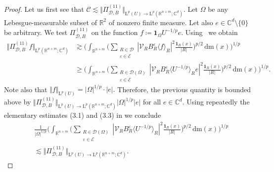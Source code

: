 \documentclass{article}
\theoremstyle{definition}
\theoremstyle{remark}
\numberwithin{equation}{section}
\newcommand{\mathdm}{\,\mathrm{dm}}
\newcommand{\cC}{\mathcal{C}}
\newcommand{\cE}{\mathcal{E}}
\newcommand{\cV}{\mathcal{V}}
\newcommand{\bfD}{\bm{\mathcal{D}}}
\newcommand{\e}{\varepsilon}
\newcommand{\reals}{\mathbb{R}}
\newcommand{\complex}{\mathbb{C}}
\newcommand{\Lp}[1]{\mathrm{L}^{#1}}
\newcommand{\1}{\mathbf{1}}
\begin{document}
\begin{proof}
        Let us first see that $\cC\lesssim\Vert\Pi_{\bfD,B}^{(11)}\Vert_{\Lp{p}(U)\rightarrow \Lp{p}(\reals^{n+m};\complex^d)}.$ Let $\Omega$ be any Lebesgue-measurable subset of $\reals^2$ of nonzero finite measure. Let also $e\in\complex^d\setminus\{0\}$ be arbitrary. We test $\Pi_{\bfD,B}^{(11)}$ on the function $f\coloneq \1_{\Omega}U^{-1/p}e.$ Using~\cite[Lemma~5.3]{DKPS2024} we obtain
        \begin{align*}
            \Vert\Pi_{\bfD,B}^{(11)}f\Vert_{\Lp{p}(\reals^{n+m};\complex^d)}
            &\gtrsim\bigg(\int_{\reals^{n+m}}\bigg(\sum_{\substack{R\in\bfD\\\e\in\cE}}|\cV_{R}B_{R}^{\e}\langle f\rangle_{R}|^2\frac{\1_{R}(x)}{|R|}\bigg)^{p/2}\mathdm(x)\bigg)^{1/p}\\
            &\geq\bigg(\int_{\reals^{n+m}}\bigg(\sum_{\substack{R\in\bfD(\Omega)\\\e\in\cE}}|\cV_{R}B_{R}^{\e}\langle U^{-1/p}\rangle_{R}e|^2\frac{\1_{R}(x)}{|R|}\bigg)^{p/2}\mathdm(x)\bigg)^{1/p}.
        \end{align*}
        Note also that $\Vert f\Vert_{\Lp{p}(U)}=|\Omega|^{1/p}\cdot|e|.$ Therefore, the previous quantity is bounded above by
        $\Vert\Pi_{\bfD,B}^{(11)}\Vert_{\Lp{p}(U)\rightarrow \Lp{p}(\reals^{n+m};\complex^d)} |\Omega|^{1/p} |e|$ for all $e\in\complex^d.$
        Using repeatedly the elementary estimates (3.1) and (3.3) in \cite{DKPS2024} we conclude
        \begin{align*}
            &\frac{1}{|\Omega|^{1/p}}\bigg(\int_{\reals^{n+m}}\bigg(\sum_{\substack{R\in\bfD(\Omega)\\\e\in\cE}}|\cV_{R}B_{R}^{\e}\langle U^{-1/p}\rangle_{R}|^2\frac{\1_{R}(x)}{|R|}\bigg)^{p/2}\mathdm(x)\bigg)^{1/p}\\
            &\lesssim\Vert\Pi_{\bfD,B}^{(11)}\Vert_{\Lp{p}(U)\rightarrow \Lp{p}(\reals^{n+m};\complex^d)}.
        \end{align*}

\end{proof}
\end{document}

